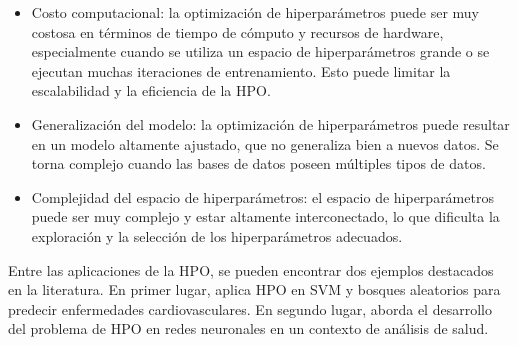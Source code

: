 \begin{itemize}
	\item Costo computacional: la optimización de hiperparámetros puede ser muy costosa en términos de tiempo de cómputo y recursos de hardware, especialmente cuando se utiliza un espacio de hiperparámetros grande o se ejecutan muchas iteraciones de entrenamiento. Esto puede limitar la escalabilidad y la eficiencia de la HPO.
	\item Generalización del modelo: la optimización de hiperparámetros puede resultar en un modelo altamente ajustado, que no generaliza bien a nuevos datos. Se torna complejo cuando las bases de datos poseen múltiples tipos de datos.
	\item Complejidad del espacio de hiperparámetros: el espacio de hiperparámetros puede ser muy complejo y estar altamente interconectado, lo que dificulta la exploración y la selección de los hiperparámetros adecuados.
\end{itemize}

Entre las aplicaciones de la HPO, se pueden encontrar dos ejemplos destacados en la literatura. En primer lugar, \citep{hernandeztecnicas} aplica HPO en SVM y bosques aleatorios para predecir enfermedades cardiovasculares. En segundo lugar, \citep{waring2020automated} aborda el desarrollo del problema de HPO en redes neuronales en un contexto de análisis de salud.

